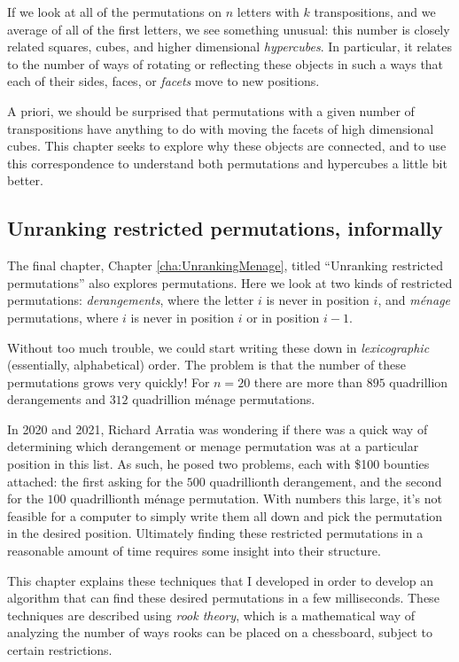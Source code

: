 If we look at all of the permutations on $n$ letters with $k$ transpositions,
and we average of all of the first letters, we see
something unusual: this number is closely related
squares, cubes, and higher dimensional \textit{hypercubes}.
In particular, it relates to the number of ways of rotating or reflecting
these objects in such a ways that each of their sides, faces, or \textit{facets}
move to new positions.

A priori, we should be surprised that permutations with a given number of
transpositions have anything to do with moving the facets of high dimensional
cubes. This chapter seeks to explore why these objects are connected, and
to use this correspondence to understand both permutations and hypercubes a
little bit better.

\subsection{Unranking restricted permutations, informally}
The final chapter, Chapter \ref{cha:UnrankingMenage},
titled ``Unranking restricted permutations''
also explores permutations.
Here we look at
two kinds of restricted permutations: \textit{derangements}, where the letter $i$ is never
in position $i$, and \textit{m\'enage} permutations, where $i$ is never in
position $i$ or in position $i - 1$.

Without too much trouble, we could start writing these down in
\textit{lexicographic} (essentially, alphabetical) order. The
problem is that the number of these permutations grows very quickly! For
$n=20$ there are more than $895$ quadrillion derangements and
$312$ quadrillion m\'enage permutations.

In 2020 and 2021, Richard Arratia
was wondering if there was a quick way of determining which derangement or
menage permutation was at a particular position in this list.
As such, he posed two problems, each with \$100 bounties attached:
the first asking for the $500$ quadrillionth derangement, and
the second for the $100$ quadrillionth m\'enage permutation.
With numbers this large, it's not feasible for a computer to simply
write them all down and pick the permutation in the desired position.
Ultimately finding these restricted permutations in a reasonable amount of time
requires some insight into their structure.

This chapter explains these techniques that I developed in order to develop
an algorithm that can find these desired permutations in a few milliseconds.
These techniques are
described using \textit{rook theory}, which is a mathematical way of analyzing
the number of ways rooks can be placed on a chessboard, subject to certain
restrictions.

